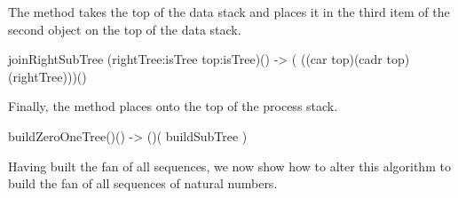 \item The  method takes the top of the data stack 
and places it in the third item of the second object on the top of the 
data stack. 

\starttyping
\startJoylolCode
joinRightSubTree (rightTree:isTree top:isTree)()
-> ( ((car top)(cadr top)(rightTree)))()
\stopJoylolCode
\stoptyping

\item Finally, the  method places 
 onto the top of the process stack. 

\starttyping
\startJoylolCode
buildZeroOneTree()() -> ()( buildSubTree )
\stopJoylolCode
\stoptyping

\stopitemize

Having built the fan of all  sequences, we now show how to 
alter this algorithm to build the fan of all sequences of natural numbers. 

